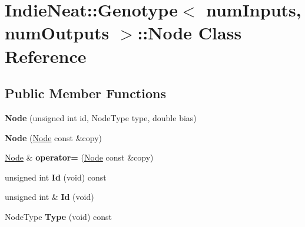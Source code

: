 \hypertarget{class_indie_neat_1_1_genotype_1_1_node}{}\section{Indie\+Neat\+:\+:Genotype$<$ num\+Inputs, num\+Outputs $>$\+:\+:Node Class Reference}
\label{class_indie_neat_1_1_genotype_1_1_node}
\subsection*{Public Member Functions}
\begin{DoxyCompactItemize}
\item 
\mbox{\label{class_indie_neat_1_1_genotype_1_1_node_a5d7418b3e1291d81039bb52ad13225c7}} 
{\bfseries Node} (unsigned int id, Node\+Type type, double bias)
\item 
\mbox{\label{class_indie_neat_1_1_genotype_1_1_node_ac0e4a7684c7cf3a528aa106298b00a14}} 
{\bfseries Node} (\hyperlink{class_indie_neat_1_1_genotype_1_1_node}{Node} const \&copy)
\item 
\mbox{\label{class_indie_neat_1_1_genotype_1_1_node_a65051b7669a59c4c4568e71592e92ef1}} 
\hyperlink{class_indie_neat_1_1_genotype_1_1_node}{Node} \& {\bfseries operator=} (\hyperlink{class_indie_neat_1_1_genotype_1_1_node}{Node} const \&copy)
\item 
\mbox{\label{class_indie_neat_1_1_genotype_1_1_node_a3951e1029ba41ae1b584b0f374ef91ec}} 
unsigned int {\bfseries Id} (void) const
\item 
\mbox{\label{class_indie_neat_1_1_genotype_1_1_node_a1fde22ec1338f9fbe03a18cdb4052d41}} 
unsigned int \& {\bfseries Id} (void)
\item 
\mbox{\label{class_indie_neat_1_1_genotype_1_1_node_ac93e7a4380f8a758a645c96ecbf24b4e}} 
Node\+Type {\bfseries Type} (void) const
\item 
\mbox{\label{class_indie_neat_1_1_genotype_1_1_node_a342408de90a77b653ac7b8321486ddf1}} 

\end{DoxyCompactItemize}
